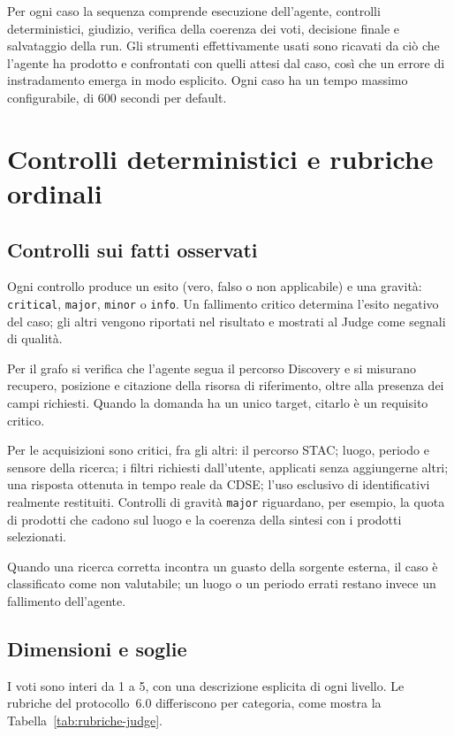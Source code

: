 Per ogni caso la sequenza comprende esecuzione dell'agente, controlli
deterministici, giudizio, verifica della coerenza dei voti, decisione finale e
salvataggio della run. Gli strumenti effettivamente usati sono ricavati da ciò
che l'agente ha prodotto e confrontati con quelli attesi dal caso, così che un
errore di instradamento emerga in modo esplicito. Ogni caso ha un tempo massimo
configurabile, di 600 secondi per default.

\section{Controlli deterministici e rubriche ordinali}

\subsection{Controlli sui fatti osservati}

Ogni controllo produce un esito (vero, falso o non applicabile) e una gravità:
\texttt{critical}, \texttt{major}, \texttt{minor} o \texttt{info}. Un
fallimento critico determina l'esito negativo del caso; gli altri vengono
riportati nel risultato e mostrati al Judge come segnali di qualità.

Per il grafo si verifica che l'agente segua il percorso Discovery e si
misurano recupero, posizione e citazione della risorsa di riferimento, oltre
alla presenza dei campi richiesti. Quando la domanda ha un unico target, citarlo
è un requisito critico.

Per le acquisizioni sono critici, fra gli altri: il percorso STAC; luogo,
periodo e sensore della ricerca; i filtri richiesti dall'utente, applicati
senza aggiungerne altri; una risposta ottenuta in tempo reale da CDSE;
l'uso esclusivo di identificativi realmente restituiti. Controlli di gravità
\texttt{major} riguardano, per esempio, la quota di prodotti che cadono sul
luogo e la coerenza della sintesi con i prodotti selezionati.

Quando una ricerca corretta incontra un guasto della sorgente esterna, il caso
è classificato come non valutabile; un luogo o un periodo errati restano
invece un fallimento dell'agente.

\subsection{Dimensioni e soglie}

I voti sono interi da 1 a 5, con una descrizione esplicita di ogni livello. Le
rubriche del protocollo~6.0 differiscono per categoria, come mostra la
Tabella~\ref{tab:rubriche-judge}.

